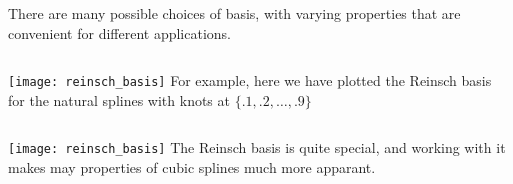 %
%
\begin{frame}
  There are many possible choices of basis, with varying properties that are convenient for different applications. 
\end{frame}
%
%
\begin{frame}
  \begin{columns}
      \texttt{[image: reinsch\_basis]}
      For example, here we have plotted the Reinsch basis for the natural splines with knots at $\{ .1, .2, \ldots, .9\}$
  \end{columns}
\end{frame}
%
%
\begin{frame}
  \begin{columns}
      \texttt{[image: reinsch\_basis]}
      The Reinsch basis is quite special, and working with it makes may properties of cubic splines much more apparant.
  \end{columns}
  
\end{frame}

